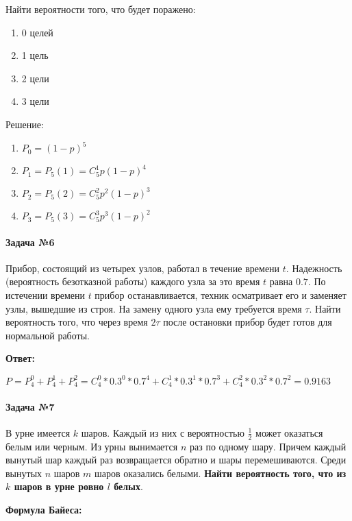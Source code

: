 \documentclass{article}
\begin{document}
Найти вероятности того, что будет поражено:

\begin{enumerate}
    \item 0 целей
    \item 1 цель
    \item 2 цели
    \item 3 цели
\end{enumerate}

Решение:

\begin{enumerate}
    \item $P_0 = (1 - p)^5$
    \item $P_1 = P_{5}(1) = C_{5}^{1} p (1 - p)^4$
    \item $P_2 = P_{5}(2) = C_{5}^{2} p^2 (1 - p)^3$
    \item $P_3 = P_{5}(3) = C_{5}^{3} p^3 (1 - p)^2$
\end{enumerate}

\paragraph{Задача №6}

Прибор, состоящий из четырех узлов, работал в течение времени $t$. Надежность (вероятность безотказной работы) каждого узла за это время $t$ равна $0.7$. По истечении времени $t$ прибор останавливается, техник осматривает его и заменяет узлы, вышедшие из строя. На замену одного узла ему требуется время $\tau$. Найти вероятность того, что через время $2 \tau$ после остановки прибор будет готов для нормальной работы.

\textbf{Ответ:}

$P = P_{4}^{0} + P_{4}^{1} + P_{4}^{2} = C_{4}^{0} * 0.3^{0} * 0.7^{4} + C_{4}^{1} * 0.3^{1} * 0.7^{3} + C_{4}^{2} * 0.3^{2} * 0.7^{2} = 0.9163$

\paragraph{Задача №7}

В урне имеется $k$ шаров. Каждый из них с вероятностью $\frac{1}{2}$ может оказаться белым или черным. Из урны вынимается $n$ раз по одному шару. Причем каждый вынутый шар каждый раз возвращается обратно и шары перемешиваются. Среди вынутых $n$ шаров $m$ шаров оказались белыми. \textbf{Найти вероятность того, что из $k$ шаров в урне ровно $l$ белых}.

\textbf{Формула Байеса:}
\end{document}

